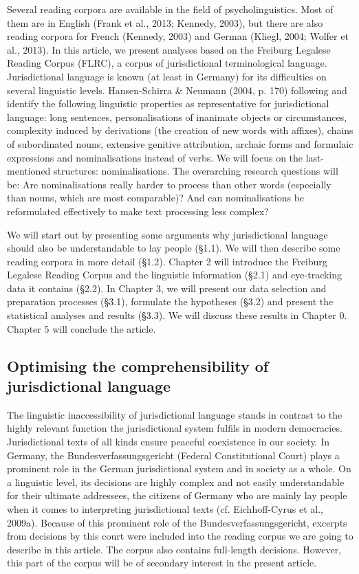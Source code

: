\documentclass[output=paper]{langsci/langscibook}
\begin{document}
Several reading corpora are available in the field of psycholinguistics. Most of them are in English (Frank et al., 2013; Kennedy, 2003), but there are also reading corpora for French (Kennedy, 2003) and German (Kliegl, 2004; Wolfer et al., 2013). In this article, we present analyses based on the Freiburg Legalese Reading Corpus (FLRC), a corpus of jurisdictional terminological language. Jurisdictional language is known (at least in Germany) for its difficulties on several linguistic levels. Hansen-Schirra \& Neumann (2004, p. 170) following \citet{Oksaar1988} and \citet{Wagner1981} identify the following linguistic properties as representative for jurisdictional language: long sentences, personalisations of inanimate objects or circumstances, complexity induced by derivations (the creation of new words with affixes), chains of subordinated nouns, extensive genitive attribution, archaic forms and formulaic expressions and nominalisations instead of verbs. We will focus on the last-mentioned structures: nominalisations. The overarching research questions will be: Are nominalisations really harder to process than other words (especially than nouns, which are most comparable)? And can nominalisations be reformulated effectively to make text processing less complex?

We will start out by presenting some arguments why jurisdictional language should also be understandable to lay people (§1.1). We will then describe some reading corpora in more detail (§1.2). Chapter 2 will introduce the Freiburg Legalese Reading Corpus and the linguistic information (§2.1) and eye-tracking data it contains (§2.2). In Chapter 3, we will present our data selection and preparation processes (§3.1), formulate the hypotheses (§3.2) and present the statistical analyses and results (§3.3). We will discuss these results in Chapter 0. Chapter 5 will conclude the article.

\subsection{\label{bkm:Ref283725774}Optimising the comprehensibility of jurisdictional language}

The linguistic inaccessibility of jurisdictional language stands in contrast to the highly relevant function the jurisdictional system fulfils in modern democracies. Jurisdictional texts of all kinds ensure peaceful coexistence in our society. In Germany, the Bundesverfassungsgericht (Federal Constitutional Court) plays a prominent role in the German jurisdictional system and in society as a whole. On a linguistic level, its decisions are highly complex and not easily understandable for their ultimate addressees, the citizens of Germany who are mainly lay people when it comes to interpreting jurisdictional texts (cf. Eichhoff-Cyrus et al., 2009a). Because of this prominent role of the Bundesverfassungsgericht, excerpts from decisions by this court were included into the reading corpus we are going to describe in this article. The corpus also contains full-length decisions. However, this part of the corpus will be of secondary interest in the present article. 
\end{document}
